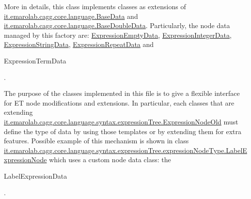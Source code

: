 More in details, this class implements classes as extensions of \hyperlink{}{it.\-emarolab.\-cagg.\-core.\-language.\-Base\-Data} and \hyperlink{}{it.\-emarolab.\-cagg.\-core.\-language.\-Base\-Double\-Data}. Particularly, the node data managed by this factory are\-: \hyperlink{classit_1_1emarolab_1_1cagg_1_1core_1_1language_1_1syntax_1_1expressionTree_1_1ExpressionDataFactory_1_1ExpressionEmptyData}{Expression\-Empty\-Data}, \hyperlink{classit_1_1emarolab_1_1cagg_1_1core_1_1language_1_1syntax_1_1expressionTree_1_1ExpressionDataFactory_1_1ExpressionIntegerData}{Expression\-Integer\-Data}, \hyperlink{classit_1_1emarolab_1_1cagg_1_1core_1_1language_1_1syntax_1_1expressionTree_1_1ExpressionDataFactory_1_1ExpressionStringData}{Expression\-String\-Data}, \hyperlink{classit_1_1emarolab_1_1cagg_1_1core_1_1language_1_1syntax_1_1expressionTree_1_1ExpressionDataFactory_1_1ExpressionRepeatData}{Expression\-Repeat\-Data} and
\begin{DoxyCode}
ExpressionTermData 
\end{DoxyCode}
 .\par


The purpose of the classes implemented in this file is to give a flexible interface for E\-T node modifications and extensions. In particular, each classes that are extending \hyperlink{}{it.\-emarolab.\-cagg.\-core.\-language.\-syntax.\-expression\-Tree.\-Expression\-Node\-Old} must define the type of data by using those templates or by extending them for extra features. Possible example of this mechanism is shown in class \hyperlink{classit_1_1emarolab_1_1cagg_1_1core_1_1language_1_1syntax_1_1expressionTree_1_1expressionNodeType_1_1LabelExpressionNode}{it.\-emarolab.\-cagg.\-core.\-language.\-syntax.\-expression\-Tree.\-expression\-Node\-Type.\-Label\-Expression\-Node} which uses a custom node data class\-: the
\begin{DoxyCode}
LabelExpressionData 
\end{DoxyCode}
 . 

